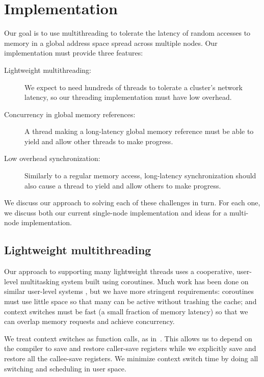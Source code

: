 \documentclass[10pt,nocopyrightspace]{sigplanconf}
\begin{document}
\section{Implementation}
\label{sec:approach}
Our goal is to use multithreading to tolerate
the latency of random accesses to memory in a global address space
spread across multiple nodes.  Our implementation must provide three features:
\begin{description}
\item[Lightweight multithreading:] We expect to need hundreds of
  threads to tolerate a cluster's network latency, so our threading
  implementation must have low overhead.

\item[Concurrency in global memory references:] A thread making a
  long-latency global memory reference must be able to yield and allow
  other threads to make progress.

\item[Low overhead synchronization:] 
  Similarly to a regular memory access, long-latency synchronization
  should also cause a thread to yield and allow others to make
  progress. %
\end{description}
We discuss our approach to solving each of these challenges in
turn. For each one, we discuss both our current single-node
implementation and ideas for a multi-node implementation.

\subsection{Lightweight multithreading}

Our approach to supporting many lightweight threads uses a
cooperative, user-level multitasking system built using
coroutines. Much work has been done on similar user-level systems
\cite{ult,capriccio}, but we have more stringent requirements:
coroutines must use little space so that many can be active without
trashing the cache; and context switches must be fast (a small
fraction of memory latency) so that we can overlap memory requests and
achieve concurrency.

We treat context switches as function calls, as
in~\cite{charm}. This allows us to depend on the compiler to save and
restore caller-save registers while we explicitly save and restore all
the callee-save registers.  We minimize context switch time by doing
all switching and scheduling in user space.
\end{document}
